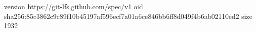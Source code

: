 version https://git-lfs.github.com/spec/v1
oid sha256:85c3862c9c89f10b45197af596ecf7a01a6ce846bb6ff8d049f4b6ab02110ed2
size 1932
